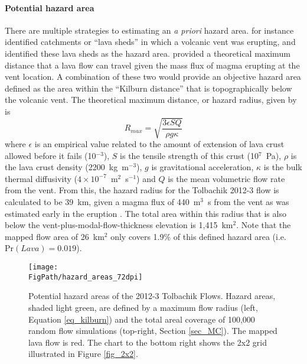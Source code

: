 	\paragraph{Potential hazard area} There are multiple strategies to estimating an \textit{a priori} hazard area. \citet{kauahikaua1995applications} for instance identified catchments or ``lava sheds'' in which a volcanic vent was erupting, and identified these lava sheds as the hazard area. \citet{kilburn2000lava} provided a theoretical maximum distance that a lava flow can travel given the mass flux of magma erupting at the vent location. A combination of these two would provide an objective hazard area defined as the area within the ``Kilburn distance'' that is topographically below the volcanic vent. The theoretical maximum distance, or hazard radius, given by \citet{kilburn2000lava} is
		\begin{equation}
		R_{max}=\sqrt{\frac{3\epsilon SQ}{\rho g\kappa}}
		\label{eq_kilburn}
		\end{equation}
	where $\epsilon$ is an empirical value related to the amount of extension of lava crust allowed before it fails (10$^{-3}$), $S$ is the tensile strength of this crust (10$^7$~Pa), $\rho$ is the lava crust density (2200~kg~m$^{-3}$), $g$ is gravitational acceleration, $\kappa$ is the bulk thermal diffusivity ($4\times 10^{-7}$~m$^{2}$~s$^{-1}$) and $Q$ is the mean volumetric flow rate from the vent. From this, the hazard radius for the Tolbachik 2012-3 flow is calculated to be 39~km, given a magma flux of 440~m$^3$~s from the vent as was estimated early in the eruption \citep{belousov2015overview}. The total area within this radius that is also below the vent-plus-modal-flow-thickness elevation is 1,415~km$^2$. Note that the mapped flow area of 26~km$^2$ only covers 1.9\% of this defined hazard area (i.e. $\text{Pr}(Lava) = 0.019$).
	
		\begin{figure}
			\centering
			\texttt{[image: \\FigPath/hazard\_areas\_72dpi]}
			\caption[Potential hazard areas of the 2012-3 Tolbachik Flows]{Potential hazard areas of the 2012-3 Tolbachik Flows. Hazard areas, shaded light green, are defined by a maximum flow radius (left, Equation \ref{eq_kilburn}) and the total areal coverage of 100,000 random flow simulations (top-right, Section \ref{sec_MC}). The mapped lava flow is red. The chart to the bottom right shows the 2x2 grid illustrated in Figure \ref{fig_2x2}.}
			\label{fig_hazardarea}
		\end{figure}
	
